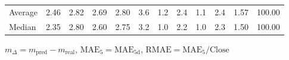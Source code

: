 \begin{threeparttable}
{\begin{tabular}{lrrrrrrrrrrr}
Average &          2.46 &          2.82 &          2.69 &        2.80 &                 3.6 &                 1.2 &        2.4 &                 1.1 &              2.4 &            1.57 &                 100.00 \\
 Median &          2.35 &          2.80 &          2.60 &        2.75 &                 3.2 &                 1.0 &        2.2 &                 1.0 &              2.3 &            1.50 &                 100.00 \\
\bottomrule
\end{tabular}
}
\begin{tablenotes}\footnotesize
\item $m_\Delta=m_{\text{pred}}-m_{\text{real}}$,
$\mathrm{MAE}_5=\mathrm{MAE}_{5\text{d}}$,
$\mathrm{RMAE}=\mathrm{MAE}_5/\text{Close}$
\end{tablenotes}
\end{threeparttable}
\endgroup

